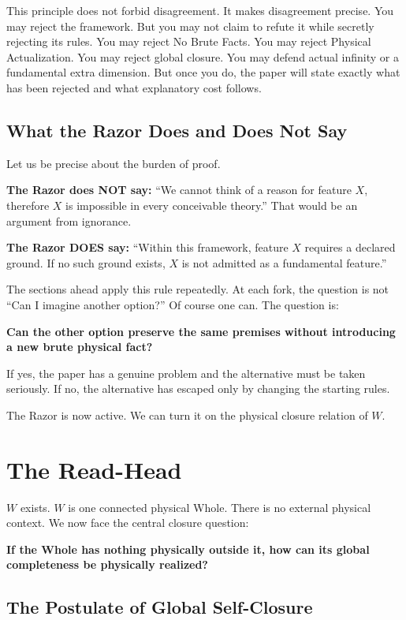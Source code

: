 \documentclass[11pt]{article}
\theoremstyle{canonstyle}
\begin{document}
This principle does not forbid disagreement. It makes disagreement precise. You may reject the framework. But you may not claim to refute it while secretly rejecting its rules. You may reject No Brute Facts. You may reject Physical Actualization. You may reject global closure. You may defend actual infinity or a fundamental extra dimension. But once you do, the paper will state exactly what has been rejected and what explanatory cost follows.

\subsection{What the Razor Does and Does Not Say}

Let us be precise about the burden of proof.

\textbf{The Razor does NOT say:} ``We cannot think of a reason for feature $X$, therefore $X$ is impossible in every conceivable theory.'' That would be an argument from ignorance.

\textbf{The Razor DOES say:} ``Within this framework, feature $X$ requires a declared ground. If no such ground exists, $X$ is not admitted as a fundamental feature.''

The sections ahead apply this rule repeatedly. At each fork, the question is not ``Can I imagine another option?'' Of course one can. The question is:

\textbf{Can the other option preserve the same premises without introducing a new brute physical fact?}

If yes, the paper has a genuine problem and the alternative must be taken seriously. If no, the alternative has escaped only by changing the starting rules.

The Razor is now active. We can turn it on the physical closure relation of $W$.

\newpage
\section{The Read-Head}

$W$ exists. $W$ is one connected physical Whole. There is no external physical context. We now face the central closure question:

\begin{center}
\textbf{If the Whole has nothing physically outside it, how can its global completeness be physically realized?}
\end{center}

\subsection{The Postulate of Global Self-Closure}
\end{document}
